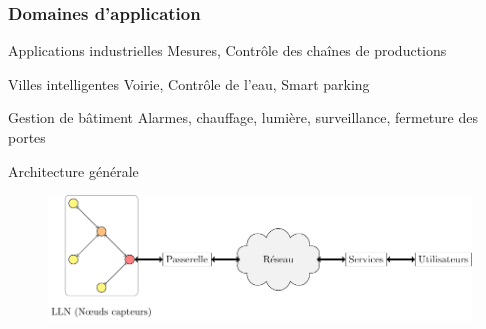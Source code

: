 \begin{frame}\frametitle{Domaines d'application}

    \begin{block}{Applications industrielles}
      Mesures, Contrôle des chaînes de productions
    \end{block}
  
    \begin{block}{Villes intelligentes}
      Voirie, Contrôle de l'eau, Smart parking
    \end{block}
  
    \begin{block}{Gestion de bâtiment}
      Alarmes, chauffage, lumière, surveillance, fermeture des portes
    \end{block}
  

  
\end{frame}

\begin{frame}{Architecture générale}
  \begin{figure}
    \centering
    \includegraphics[scale=.75]{figures/architecture_general_slides.pdf}
  \end{figure}


\end{frame}

